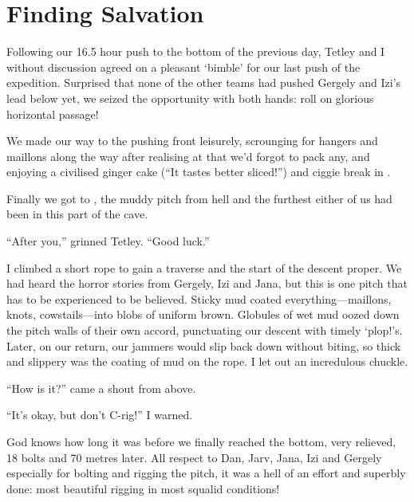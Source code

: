 

\section{Finding Salvation}



Following our 16.5 hour push to the bottom of  the
previous day, Tetley and I without discussion agreed on a pleasant
`bimble' for our last push of the expedition. Surprised that none of the
other teams had pushed Gergely and Izi's lead below  yet, we seized the opportunity with both hands: roll on
glorious horizontal passage!

We made our way to the pushing front leisurely, scrounging for hangers
and maillons along the way after realising at  that we'd
forgot to pack any, and enjoying a civilised ginger cake (``It tastes
better sliced!'') and ciggie break in .

Finally we got to , the muddy pitch from hell
and the furthest either of us had been in this part of the cave.

``After you,'' grinned Tetley. ``Good luck.''

I climbed a short rope to gain a traverse and the start of the descent
proper. We had heard the horror stories from Gergely, Izi and Jana, but
this is one pitch that has to be experienced to be believed. Sticky mud
coated everything---maillons, knots, cowstails---into blobs of uniform
brown. Globules of wet mud oozed down the pitch walls of their own
accord, punctuating our descent with timely `plop!'s. Later, on our
return, our jammers would slip back down without biting, so thick and
slippery was the coating of mud on the rope. I let out an incredulous
chuckle.

``How is it?'' came a shout from above.

``It's okay, but don't C-rig!'' I warned.

God knows how long it was before we finally reached the bottom, very
relieved, 18 bolts and 70 metres later. All respect to Dan, Jarv, Jana,
Izi and Gergely especially for bolting and rigging the pitch, it was a
hell of an effort and superbly done: most beautiful rigging in most
squalid conditions!

